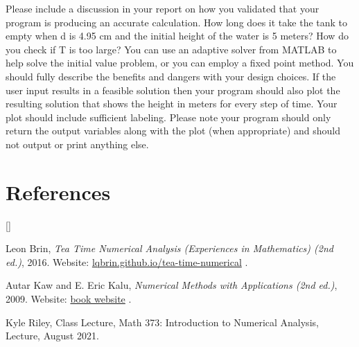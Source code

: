 \documentclass{article}
\def\beginrefs{\begin{list}%
        {[\arabic{equation}]}{\usecounter{equation}
         \setlength{\leftmargin}{2.0truecm}\setlength{\labelsep}{0.4truecm}%
         \setlength{\labelwidth}{1.6truecm}}}
\def\endrefs{\end{list}}
\def\bibentry#1{\item[\hbox{[#1]}]}
\begin{document}
Please include a discussion in your report on how you validated that your program is producing an accurate calculation. How long does it take the tank to empty when d is 4.95 cm and the initial height of the water is 5 meters? How do you check if T is too large? You can use an adaptive solver from MATLAB to help solve the initial value problem, or you can employ a fixed point method. You should fully describe the benefits and dangers with your design choices. If the user input results in a feasible solution then your program should also plot the resulting solution that shows the height in meters for every step of time. Your plot should include sufficient labeling. Please note your program should only return the output variables along with the plot (when appropriate) and should not output or print anything else. 



\par \bigskip \par

\section*{References}
\beginrefs

\bibentry{LB16}{\sc Leon Brin},
{\it Tea Time Numerical Analysis (Experiences in Mathematics)  (2nd ed.)}, 2016. Website: \href{http://lqbrin.github.io/tea-time-numerical/}{lqbrin.github.io/tea-time-numerical} .

\bibentry{KK09} {\sc Autar Kaw} and {\sc E. Eric Kalu}, {\it Numerical Methods with Applications (2nd ed.)}, 2009. Website: \href{http://autarkaw.com/books/numericalmethods/index.html}{book website} .

\bibentry{KR21} {\sc Kyle Riley}, Class Lecture, Math 373: Introduction to Numerical Analysis, Lecture, August 2021. 
\endrefs
\par \bigskip \noindent
\end{document}
